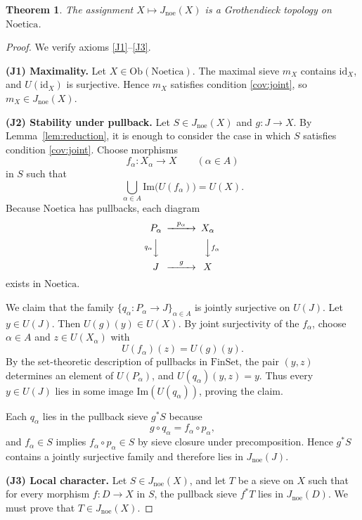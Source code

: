 \documentclass[11pt]{amsart}
\numberwithin{equation}{section}
\newtheorem{theorem}{Theorem}[section]
\theoremstyle{definition}
\theoremstyle{remark}
\newcommand{\Noetica}{\mathrm{Noetica}}
\newcommand{\FinSet}{\mathrm{FinSet}}
\newcommand{\id}{\mathrm{id}}
\newcommand{\Jnoe}{J_{\mathrm{noe}}}
\begin{document}
\begin{theorem}\label{thm:Jnoe-topology}
The assignment \(X \mapsto \Jnoe(X)\) is a Grothendieck topology on \(\Noetica\).
\end{theorem}

\begin{proof}
We verify axioms \ref{J1}--\ref{J3}.

\smallskip
\noindent\textbf{(J1) Maximality.}
Let \(X \in \mathrm{Ob}(\Noetica)\). The maximal sieve \(m_X\) contains \(\id_X\), and \(U(\id_X)\) is surjective. Hence \(m_X\) satisfies condition \ref{cov:joint}, so \(m_X \in \Jnoe(X)\).

\smallskip
\noindent\textbf{(J2) Stability under pullback.}
Let \(S \in \Jnoe(X)\) and \(g : J \to X\). By Lemma~\ref{lem:reduction}, it is enough to consider the case in which \(S\) satisfies condition \ref{cov:joint}. Choose morphisms
\[
f_{\alpha} : X_{\alpha} \to X \qquad (\alpha \in A)
\]
in \(S\) such that
\[
\bigcup_{\alpha \in A}\mathrm{Im}\bigl(U(f_{\alpha})\bigr)=U(X).
\]
Because \(\Noetica\) has pullbacks, each diagram
\[
\begin{CD}
P_{\alpha} @>{p_{\alpha}}>> X_{\alpha}\\
@V{q_{\alpha}}VV @VV{f_{\alpha}}V\\
J @>{g}>> X
\end{CD}
\]
exists in \(\Noetica\).

We claim that the family \(\{q_{\alpha} : P_{\alpha} \to J\}_{\alpha \in A}\) is jointly surjective on \(U(J)\). Let \(y \in U(J)\). Then \(U(g)(y)\in U(X)\). By joint surjectivity of the \(f_{\alpha}\), choose \(\alpha \in A\) and \(z \in U(X_{\alpha})\) with
\[
U(f_{\alpha})(z)=U(g)(y).
\]
By the set-theoretic description of pullbacks in \(\FinSet\), the pair \((y,z)\) determines an element of \(U(P_{\alpha})\), and \(U(q_{\alpha})(y,z)=y\). Thus every \(y \in U(J)\) lies in some image \(\mathrm{Im}(U(q_{\alpha}))\), proving the claim.

Each \(q_{\alpha}\) lies in the pullback sieve \(g^{*}S\) because
\[
g \circ q_{\alpha} = f_{\alpha}\circ p_{\alpha},
\]
and \(f_{\alpha}\in S\) implies \(f_{\alpha}\circ p_{\alpha}\in S\) by sieve closure under precomposition. Hence \(g^{*}S\) contains a jointly surjective family and therefore lies in \(\Jnoe(J)\).

\smallskip
\noindent\textbf{(J3) Local character.}
Let \(S \in \Jnoe(X)\), and let \(T\) be a sieve on \(X\) such that for every morphism \(f : D \to X\) in \(S\), the pullback sieve \(f^{*}T\) lies in \(\Jnoe(D)\). We must prove that \(T \in \Jnoe(X)\).


\end{proof}
\end{document}
